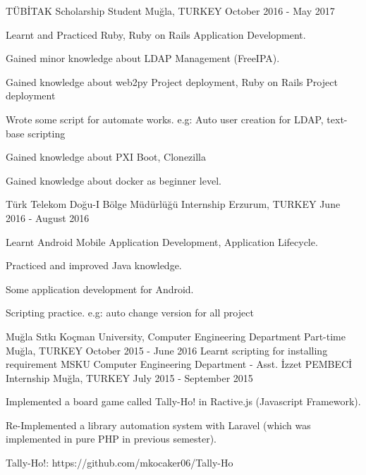 \begin{cventries}
	\cventry
		{TÜBİTAK}
		{Scholarship Student}
		{Muğla, TURKEY}
		{October 2016 - May 2017}
		{
			\begin{cvitems}
				\item {Learnt and Practiced Ruby, Ruby on Rails Application Development.}
				\item {Gained minor knowledge about LDAP Management (FreeIPA).}
				\item {Gained knowledge about web2py Project deployment, Ruby on Rails Project deployment}
				\item {Wrote some script for automate works. e.g: Auto user creation for LDAP, text-base scripting}
				\item {Gained knowledge about PXI Boot, Clonezilla}
				\item {Gained knowledge about docker as beginner level.}
			\end{cvitems}
		}
	\cventry
		{Türk Telekom Doğu-I Bölge Müdürlüğü}
		{Internship}
		{Erzurum, TURKEY}
		{June 2016 - August 2016}
		{
			\begin{cvitems}
				\item {Learnt Android Mobile Application Development, Application Lifecycle.}
				\item {Practiced and improved Java knowledge.}
				\item {Some application development for Android.}
				\item {Scripting practice. e.g: auto change version for all project}
			\end{cvitems}
		}
	\cventry
		{Muğla Sıtkı Koçman University, Computer Engineering Department}
		{Part-time}
		{Muğla, TURKEY}
		{October 2015 - June 2016}
		{Learnt scripting for installing requirement}
	\cventry
		{MSKU Computer Engineering Department - Asst. İzzet PEMBECİ}
		{Internship}
		{Muğla, TURKEY}
		{July 2015 - September 2015}
		{
		  \begin{cvitems}
			\item {Implemented a board game called Tally-Ho! in Ractive.js (Javascript Framework).}
			\item {Re-Implemented a library automation system with Laravel (which was implemented in pure PHP in previous semester).}
			\item {Tally-Ho!: https://github.com/mkocaker06/Tally-Ho}
		  \end{cvitems}
		}

\end{cventries}
